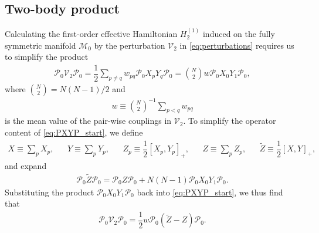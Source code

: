 \documentclass[nofootinbib,notitlepage,11pt]{revtex4-2}
\newcommand{\f}[2]{\dfrac{#1}{#2}} %
\newcommand{\p}[1]{\left(#1\right)} %
\renewcommand{\sp}[1]{\left[#1\right]} %
\newcommand{\1}{\mathds{1}}
\newcommand{\M}{\mathcal{M}}
\renewcommand{\P}{\mathcal{P}}
\newcommand{\V}{\mathcal{V}}
\begin{document}
\subsection{Two-body product}
\label{sec:PXYP}

Calculating the first-order effective Hamiltonian $H_2^{(1)}$ induced
on the fully symmetric manifold $\M_0$ by the perturbation $\V_2$ in
\eqref{eq:perturbations} requires us to simplify the product
\begin{align}
  \P_0 \V_2 \P_0
  = \f12 \sum_{p\ne q} w_{pq} \P_0 X_p Y_q \P_0
  = {N\choose 2} w \P_0 X_0 Y_1 \P_0,
  \label{eq:PXYP_start}
\end{align}
where ${N\choose2}=N\p{N-1}/2$ and
\begin{align}
  w \equiv {N\choose 2}^{-1} \sum_{p<q} w_{pq}
\end{align}
is the mean value of the pair-wise couplings in $\V_2$.  To simplify
the operator content of \eqref{eq:PXYP_start}, we define
\begin{align}
  X \equiv \sum_p X_p,
  &&
  Y \equiv \sum_p Y_p,
  &&
  Z_p \equiv \f12\sp{X_p, Y_p}_+,
  &&
  Z \equiv \sum_p Z_p,
  &&
  \tilde Z \equiv \f12 \sp{X, Y}_+,
\end{align}
and expand
\begin{align}
  \P_0 \tilde Z \P_0 = \P_0 Z \P_0 + N\p{N-1} \P_0 X_0 Y_1 \P_0.
\end{align}
Substituting the product $\P_0 X_0 Y_1 \P_0$ back into
\eqref{eq:PXYP_start}, we thus find that
\begin{align}
  \P_0 \V_2 \P_0 = \f12 w \P_0 \p{\tilde Z -  Z } \P_0.
\end{align}


\end{document}
